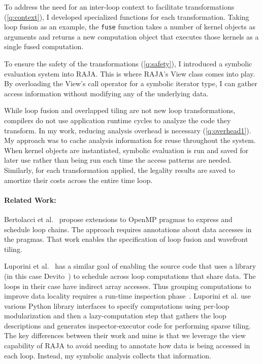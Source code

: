 \documentclass{article}
\begin{document}
To address the need for an inter-loop context to facilitate transformations (\ref{q:context}), I developed specialized functions for each transformation. 
Taking loop fusion as an example, the \verb.fuse. function takes a number of kernel objects as arguments and returns a new computation object that executes those kernels as a single fused computation. 

To ensure the safety of the transformations (\ref{q:safety}), I introduced a symbolic evaluation system into RAJA.
This is where RAJA's View class comes into play. 
By overloading the View's call operator for a symbolic iterator type, I can gather access information without modifying any of the underlying data. 

While loop fusion and overlapped tiling are not new loop transformations, compilers do not use application runtime cycles to analyze the code they transform. 
In my work, reducing analysis overhead is necessary (\ref{q:overhead1}).
My approach was to cache analysis information for reuse throughout the system.
When kernel objects are instantiated, symbolic evaluation is run and saved for later use rather than being run each time the access patterns are needed.
Similarly, for each transformation applied, the legality results are saved to amortize their costs across the entire time loop.

\paragraph{Related Work:}

Bertolacci et al.~\cite{Bertolacci2016,Bertolacci2019} propose extensions to
OpenMP pragmas to express and schedule loop chains.
The approach requires annotations about data accesses in the pragmas.
That work enables the specification of loop fusion and wavefront tiling. 

Luporini et al.~\cite{Luporini2019} has a similar goal of enabling the source
code that uses a library  (in this case Devito~\cite{Luporini2018}) to
schedule across loop computations that share data.
The loops in their case have indirect array accesses.
Thus grouping computations to improve data locality requires a run-time
inspection phase~\cite{Strout14IPDPS}.
Luporini et al. use various Python library interfaces to specify computations
using per-loop modularization and then a lazy-computation step that gathers
the loop descriptions and generates inspector-executor code for performing 
sparse tiling.
The key differences between their work and mine is that we leverage the view 
capability of RAJA to avoid needing to annotate how data is being accessed
in each loop.  
Instead, my symbolic analysis collects that information.
\end{document}
